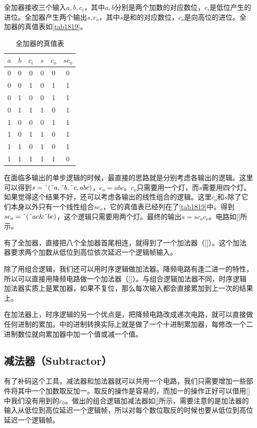 全加器接收三个输入$a,b,c_i$，其中$a,b$分别是两个加数的对应数位，$c_i$是低位产生的进位。全加器产生两个输出$s,c_o$，其中$s$是和的对应数位，$c_o$是向高位的进位。全加器的真值表如\autoref{tab1819}。

\begin{table}[!h]
\centering
\begin{tabular}{ccc|ccc}
$a$&$b$&$c_i$&$s$&$c_o$&$sc_o$\\\hline
0&0&0&0&0&0\\
0&0&1&0&1&1\\
0&1&0&0&1&1\\
0&1&1&1&0&1\\
1&0&0&0&1&1\\
1&0&1&1&0&1\\
1&1&0&1&0&1\\
1&1&1&1&1&0
\end{tabular}
\caption{全加器的真值表}\label{tab1819}
\end{table}

在面临多输出的单步逻辑的时候，最直接的思路就是分别考虑各输出的逻辑。这里可以得到$s=\textrm{\^{}}(\textrm{\~{}}a,\textrm{\~{}}b,\textrm{\~{}}c,abc)$，$c_o=abc$。$c_o$只需要用一个灯，而$s$需要用四个灯。如果觉得这个结果不好，还可以考虑各输出的线性组合的逻辑。这里$c_o$和$s$除了它们本身以外只有一个线性组合$sc_o$，它的真值表已经列在了\autoref{tab1819}中。得到$sc_o=\textrm{\~{}}(\textrm{\~{}}ac\&\textrm{\~{}}bc)$，这个逻辑只需要用两个灯。最终的输出$s=sc_oc_o$。电路如\autoref{}所示。

有了全加器，直接把八个全加器首尾相连，就得到了一个加法器（\autoref{}）。这个加法器要求两个加数从低位到高位依次延迟一个逻辑帧输入。

除了用组合逻辑，我们还可以用时序逻辑做加法器。降频电路有逢二进一的特性，所以可以直接用降频电路做一个加法器（\autoref{}）。与组合逻辑加法器不同，时序逻辑加法器实质上是累加器，如果不复位，那么每次输入都会直接累加到上一次的结果上。

在加法器上，时序逻辑的另一个优点是，把降频电路改成递次电路，就可以直接做任何进制的累加。\url{}中的进制转换实际上就是做了一个十进制累加器，每修改一个二进制数位就向累加器中加一个值或减一个值。

\subsection{减法器（Subtractor）}
有了补码这个工具，减法器和加法器就可以共用一个电路，我们只需要增加一些部件将其中一个加数取反加一。取反的操作是容易的，而加一的操作正好可以借用\autoref{}中我们没有用到的$c_0$。做出的组合逻辑加减法器如\autoref{}所示，需要注意的是加法器的输入从低位到高位延迟一个逻辑帧，所以对每个数位取反的时候也要从低位到高位延迟一个逻辑帧。

